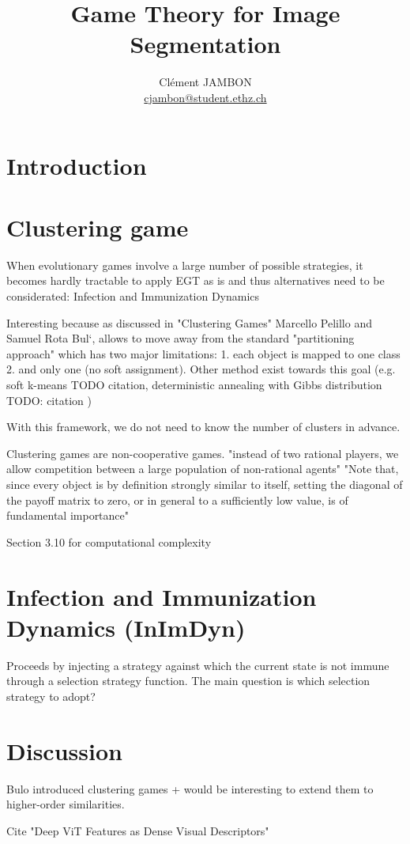 \documentclass[11pt,a4paper]{article}
\begin{document}
\title{Game Theory for Image Segmentation}
\author{Clément JAMBON \\ \href{mailto:cjambon@student.ethz.ch}{cjambon@student.ethz.ch}}
\maketitle

\begin{abstract}
    
\end{abstract}

\section{Introduction}

\section{Clustering game}

When evolutionary games involve a large number of possible strategies, it becomes hardly tractable to apply EGT as is and thus alternatives need to be considerated: Infection and Immunization Dynamics    

Interesting because as discussed in "Clustering Games" Marcello Pelillo and Samuel Rota Bul`, allows to move away from the standard "partitioning approach" which has two major limitations: 1. each object is mapped to one class 2. and only one (no soft assignment). Other method exist towards this goal (e.g. soft k-means TODO citation, deterministic annealing with Gibbs distribution TODO: citation )

With this framework, we do not need to know the number of clusters in advance.

Clustering games are non-cooperative games. "instead of two rational players, we allow competition between a large population of non-rational agents" "Note that, since every object is by definition strongly similar to itself, setting the diagonal of the payoff matrix to zero, or in general to a sufficiently low value, is of fundamental importance"

Section 3.10 for computational complexity

\section{Infection and Immunization Dynamics (InImDyn)}
Proceeds by injecting a strategy against which the current state is not immune through a selection strategy function. The main question is which selection strategy to adopt?

\section{Discussion}

Bulo introduced clustering games + would be interesting to extend them to higher-order similarities.

Cite "Deep ViT Features as Dense Visual Descriptors"
\end{document}
